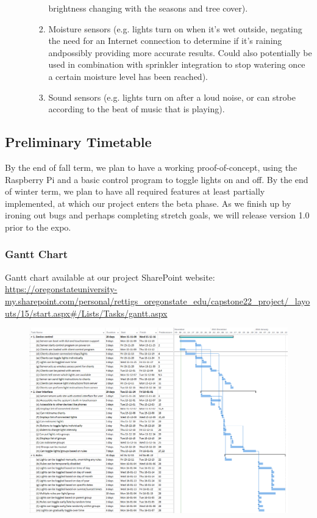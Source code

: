 \begin{enumerate}[resume]
\begin{enumerate}
\begin{enumerate}
                        brightness changing with the seasons and tree cover).
                    \item Moisture sensors (e.g. lights turn on when it's wet
                        outside, negating the need for an Internet connection
                        to determine if it's raining andpossibly providing more
                        accurate results.  Could also potentially be used in
                        combination with sprinkler integration to stop watering
                        once a certain moisture level has been reached).
                    \item Sound sensors (e.g. lights turn on after a loud
                        noise, or can strobe according to the beat of music
                        that is playing).
                \end{enumerate}
        \end{enumerate}
\end{enumerate}

\subsection{Preliminary Timetable}

By the end of fall term, we plan to have a working proof-of-concept, using the
Raspberry Pi and a basic control program to toggle lights on and off.  By the
end of winter term, we plan to have all required features at least partially
implemented, at which our project enters the beta phase.  As we finish up by
ironing out bugs and perhaps completing stretch goals, we will release version
1.0 prior to the expo.

\subsubsection{Gantt Chart}
Gantt chart available at our project SharePoint website:
\url{https://oregonstateuniversity-my.sharepoint.com/personal/rettigs_oregonstate_edu/capstone22_project/_layouts/15/start.aspx#/Lists/Tasks/gantt.aspx}
\begin{figure}
\includegraphics[width=1.0\textwidth]{ganttchart-original.png}
\end{figure}

\pagebreak
